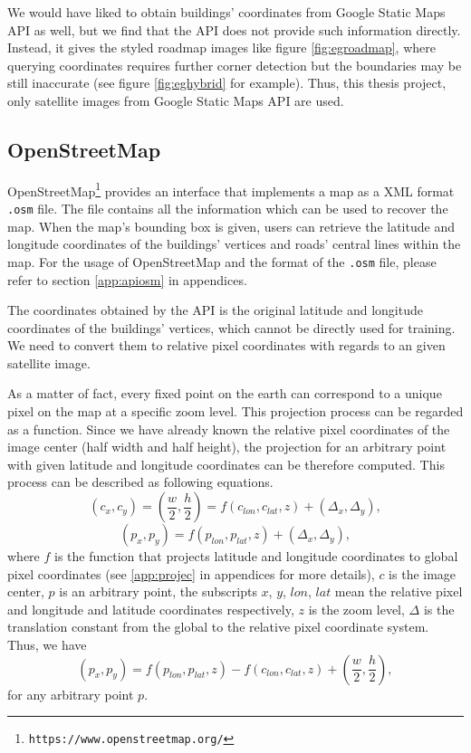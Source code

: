 

We would have liked to obtain buildings' coordinates from Google Static Maps API as well, but we find that the API does not provide such information directly. Instead, it gives the styled roadmap images like figure \ref{fig:egroadmap}, where querying coordinates requires further corner detection but the boundaries may be still inaccurate (see figure \ref{fig:eghybrid} for example). Thus, this thesis project, only satellite images from Google Static Maps API are used.

\subsection{OpenStreetMap}\label{apiosm}

OpenStreetMap\footnote{\lstinline{https://www.openstreetmap.org/}} provides an interface that implements a map as a XML format \lstinline{.osm} file. The file contains all the information which can be used to recover the map. When the map's bounding box is given, users can retrieve the latitude and longitude coordinates of the buildings' vertices and roads' central lines within the map. For the usage of OpenStreetMap and the format of the \lstinline{.osm} file, please refer to section \ref{app:apiosm} in appendices.

The coordinates obtained by the API is the original latitude and longitude coordinates of the buildings' vertices, which cannot be directly used for training. We need to convert them to relative pixel coordinates with regards to an given satellite image.

As a matter of fact, every fixed point on the earth can correspond to a unique pixel on the map at a specific zoom level. This projection process can be regarded as a function. Since we have already known the relative pixel coordinates of the image center (half width and half height), the projection for an arbitrary point with given latitude and longitude coordinates can be therefore computed. This process can be described as following equations.
\begin{equation}
	(c_x, c_y) = (\frac{w}{2}, \frac{h}{2}) = f(c_{lon}, c_{lat}, z) + (\Delta_x, \Delta_y),
\end{equation}
\begin{equation}
	(p_x, p_y) = f(p_{lon}, p_{lat}, z) + (\Delta_x, \Delta_y),
\end{equation}
where $f$ is the function that projects latitude and longitude coordinates to global pixel coordinates (see \ref{app:projec} in appendices for more details), $c$ is the image center, $p$ is an arbitrary point, the subscripts $x$, $y$, $lon$, $lat$ mean the relative pixel and longitude and latitude coordinates respectively, $z$ is the zoom level, $\Delta$ is the translation constant from the global to the relative pixel coordinate system. Thus, we have
\begin{equation}
	(p_x, p_y) = f(p_{lon}, p_{lat}, z) - f(c_{lon}, c_{lat}, z) + (\frac{w}{2}, \frac{h}{2}),
\end{equation}
for any arbitrary point $p$.

